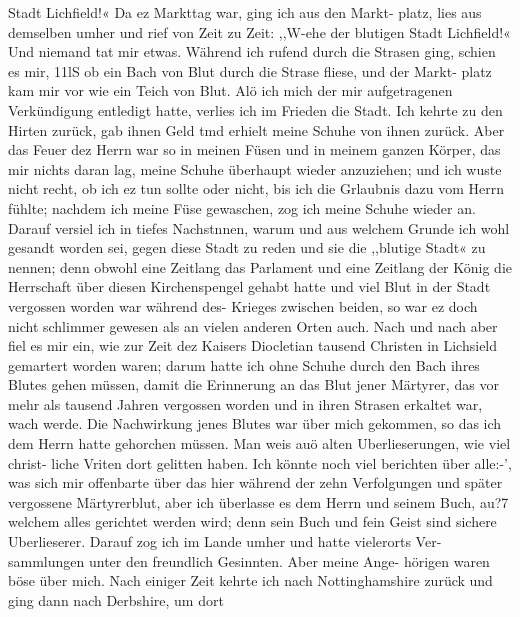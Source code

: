 Stadt Lichfield!« Da ez Markttag war, ging ich aus den Markt-
platz, lies aus demselben umher und rief von Zeit zu Zeit: ,,W-ehe
der blutigen Stadt Lichfield!« Und niemand tat mir etwas.
Während ich rufend durch die Strasen ging, schien es mir, 11lS
ob ein Bach von Blut durch die Strase fliese, und der Markt-
platz kam mir vor wie ein Teich von Blut. Alö ich mich der
mir aufgetragenen Verkündigung entledigt hatte, verlies ich im
Frieden die Stadt. Ich kehrte zu den Hirten zurück, gab ihnen
Geld tmd erhielt meine Schuhe von ihnen zurück. Aber das
Feuer dez Herrn war so in meinen Füsen und in meinem ganzen
Körper, das mir nichts daran lag, meine Schuhe überhaupt wieder
anzuziehen; und ich wuste nicht recht, ob ich ez tun sollte oder
nicht, bis ich die Grlaubnis dazu vom Herrn fühlte; nachdem ich
meine Füse gewaschen, zog ich meine Schuhe wieder an. Darauf
versiel ich in tiefes Nachstnnen, warum und aus welchem Grunde
ich wohl gesandt worden sei, gegen diese Stadt zu reden und sie
die ,,blutige Stadt« zu nennen; denn obwohl eine Zeitlang das
Parlament und eine Zeitlang der König die Herrschaft über diesen
Kirchenspengel gehabt hatte und viel Blut in der Stadt vergossen
worden war während des- Krieges zwischen beiden, so war ez
doch nicht schlimmer gewesen als an vielen anderen Orten auch.
Nach und nach aber fiel es mir ein, wie zur Zeit dez Kaisers
Diocletian tausend Christen in Lichsield gemartert worden waren;
darum hatte ich ohne Schuhe durch den Bach ihres Blutes gehen
müssen, damit die Erinnerung an das Blut jener Märtyrer, das
vor mehr als tausend Jahren vergossen worden und in ihren
Strasen erkaltet war, wach werde. Die Nachwirkung jenes Blutes
war über mich gekommen, so das ich dem Herrn hatte gehorchen
müssen. Man weis auö alten Uberlieserungen, wie viel christ-
liche Vriten dort gelitten haben. Ich könnte noch viel berichten
über alle:-’, was sich mir offenbarte über das hier während der
zehn Verfolgungen und später vergossene Märtyrerblut, aber ich
überlasse es dem Herrn und seinem Buch, au?7 welchem alles
gerichtet werden wird; denn sein Buch und fein Geist sind sichere
Uberlieserer.
Darauf zog ich im Lande umher und hatte vielerorts Ver-
sammlungen unter den freundlich Gesinnten. Aber meine Ange-
hörigen waren böse über mich. Nach einiger Zeit kehrte ich nach
Nottinghamshire zurück und ging dann nach Derbshire, um dort


